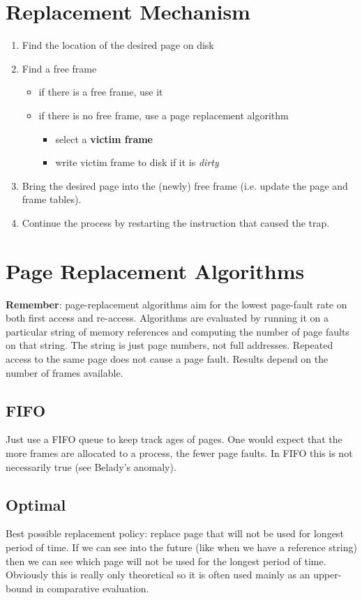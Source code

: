 \documentclass[11pt]{article}
\begin{document}
\section{Replacement Mechanism}
\label{sec:org55917b5}
\begin{enumerate}
\item Find the location of the desired page on disk
\item Find a free frame
\begin{itemize}
\item if there is a free frame, use it
\item if there is no free frame, use a page replacement algorithm
\begin{itemize}
\item select a \textbf{victim frame}
\item write victim frame to disk if it is \emph{dirty}
\end{itemize}
\end{itemize}
\item Bring the desired page into the (newly) free frame (i.e. update the page and frame tables).
\item Continue the process by restarting the instruction that caused the trap.
\end{enumerate}

\section{Page Replacement Algorithms}
\label{sec:org2388eb0}
\textbf{Remember}: page-replacement algorithms aim for the lowest page-fault rate on both first access and re-access.
Algorithms are evaluated by running it on a particular string of memory references and computing the number of page faults on that string.
The string is just page numbers, not full addresses.
Repeated access to the same page does not cause a page fault.
Results depend on the number of frames available.

\subsection{FIFO}
\label{sec:orgf91c936}
Just use a FIFO queue to keep track ages of pages.
One would expect that the more frames are allocated to a process, the fewer page faults.
In FIFO this is not necessarily true (see Belady's anomaly).

\subsection{Optimal}
\label{sec:org16609fc}
Best possible replacement policy: replace page that will not be used for longest period of time.
If we can see into the future (like when we have a reference string) then we can see which page will not be used for the longest period of time.
Obviously this is really only theoretical so it is often used mainly as an upper-bound in comparative evaluation.
\end{document}
